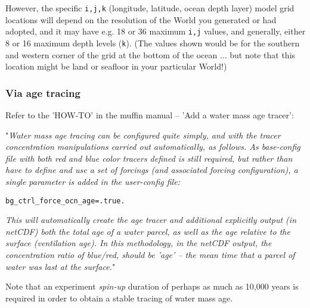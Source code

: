 \documentclass[11pt,fleqn]{book} %
\begin{document}
However, the specific \texttt{i,j,k} (longitude, latitude, ocean depth layer) model grid locations will depend on the resolution of the World you generated or had adopted, and it may have e.g. 18 or 36 maximum \texttt{i,j} values, and generally, either 8 or 16 maximum depth levels (\texttt{k}). (The values shown would be for the southern and western corner of the grid at the bottom of the ocean ... but note that this location might be land or seafloor in your particular World!)


\subsubsection{Via age tracing}

Refer to the 'HOW-TO' in the muffin manual -- 'Add a water mass age tracer':

"\textit{Water mass age tracing can be configured quite simply, and with the tracer concentration manipulations carried out automatically, as follows. As \textit{base-config} file with both red and blue color tracers defined is still required, but  rather than have to define and use a set of \textit{forcings} (and associated forcing configuration), a single parameter is added in the \textit{user-config} file:}
\vspace{-2pt}\begin{verbatim}
bg_ctrl_force_ocn_age=.true.
\end{verbatim}\vspace{-2pt}
\textit{This will automatically create the age tracer and additional explicitly output (in netCDF) both the total age of a water parcel, as well as the age relative to the surface (ventilation age). In this methodology, in the netCDF output, the concentration ratio of blue/red, should be 'age' -- the mean time that a parcel of water was last at the surface.}"

Note that an experiment \textit{spin-up} duration of perhaps as much as 10,000 years is required in order to obtain a stable tracing of water mass age.


\cleardoublepage

\end{document}
